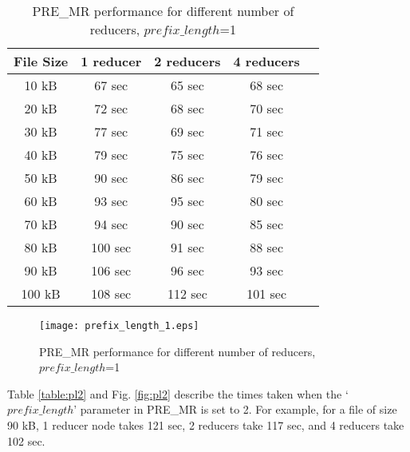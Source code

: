 \documentclass[conference]{IEEEtran}
\begin{document}
\begin{table}[htbp]
\caption{PRE\_MR performance for different number of reducers, $prefix\_length$=1}
\centering
\vspace{5pt}
\begin{tabular}{|c|c|c|c|c|}
\hline
\textbf{File Size} & \textbf{1 reducer} & \textbf{2 reducers} & \textbf{4 reducers}\\
\hline\hline
10 kB & 67 sec & 65 sec & 68 sec\\
\hline
20 kB & 72 sec & 68 sec & 70 sec \\
\hline
30 kB & 77 sec & 69 sec & 71 sec \\
\hline
40 kB & 79 sec & 75 sec & 76 sec \\
\hline
50 kB & 90 sec & 86 sec & 79 sec \\
\hline
60 kB & 93 sec & 95 sec & 80 sec \\
\hline
70 kB & 94 sec & 90 sec & 85 sec \\
\hline
80 kB & 100 sec & 91 sec & 88 sec \\
\hline
90 kB & 106 sec & 96 sec & 93 sec \\
\hline
100 kB & 108 sec & 112 sec & 101 sec  \\
\hline
\end{tabular}
\label{table:pl1}
\end{table}

\begin{figure}[htbp]
\begin{center}
\texttt{[image: prefix\_length\_1.eps]}
\end{center}
\caption{PRE\_MR performance for different number of reducers, $prefix\_length$=1}
\label{fig:pl1}
\end{figure}

Table \ref{table:pl2} and Fig. \ref{fig:pl2} describe the times taken when the `$prefix\_length$' parameter in PRE\_MR is set to 2. For example, for a file of size 90 kB, 1 reducer node takes 121 sec, 2 reducers take 117 sec, and 4 reducers take 102 sec.
\end{document}
